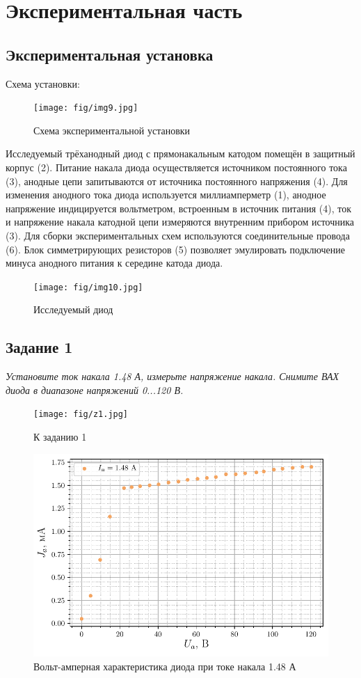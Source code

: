 \section{Экспериментальная часть}
\subsection{Экспериментальная установка}
Схема установки:
\begin{figure}[h!]
	\centering
	\texttt{[image: fig/img9.jpg]}
	\caption{Схема экспериментальной установки}
	\label{fig:10}
\end{figure}

Исследуемый трёханодный диод с прямонакальным катодом помещён в защитный корпус (2). Питание накала диода осуществляется источником постоянного тока (3), анодные цепи запитываются от источника постоянного напряжения (4). Для изменения анодного тока диода используется миллиамперметр (1), анодное напряжение индицируется вольтметром, встроенным в источник питания (4), ток и напряжение накала катодной цепи измеряются внутренним прибором источника (3). Для сборки экспериментальных схем используются соединительные провода (6). Блок симметрирующих резисторов (5) позволяет эмулировать подключение минуса анодного питания к середине катода диода.

\begin{figure}[h!]
	\centering
	\texttt{[image: fig/img10.jpg]}
	\caption{Исследуемый диод}
	\label{fig:11}
\end{figure}

\subsection{Задание 1}
\textit{Установите ток накала 1.48 А, измерьте напряжение накала. Снимите ВАХ
диода в диапазоне напряжений 0...120 В.}

\begin{figure}[h!]
	\centering
	\texttt{[image: fig/z1.jpg]}
	\caption{К заданию 1}
	\label{fig:12}
\end{figure}



\begin{figure}[H]
	\centering
    \includegraphics[scale=1]{scripts/fig1}
	\caption{Вольт-амперная характеристика диода при токе накала 1.48 А}
	\label{fig:13}
\end{figure}
\newpage
